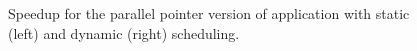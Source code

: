 \begin{figure}[!htp]
	\begin{center}
		\caption{Speedup for the parallel pointer version of \tth application with static (left) and dynamic (right) scheduling.}
		\label{fig:PointerSpeedup}
	\end{center}
\end{figure}

